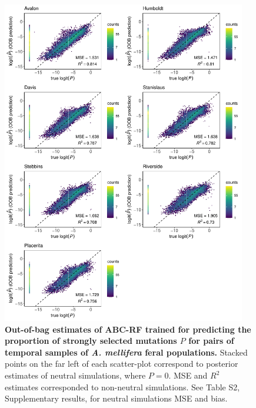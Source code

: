 \documentclass[a4paper, 12pt]{article}
\begin{document}
\begin{figure}[ht]
  \centering
  \includegraphics[width=0.95\textwidth]{Figures/FigureS19_combined_plot_pstrong.pdf}
  \small\caption{\textbf{Out-of-bag estimates of ABC-RF trained for predicting the proportion of strongly selected mutations $P$ for pairs of temporal samples of \textit{A. mellifera} feral populations.} Stacked points on the far left of each scatter-plot correspond to posterior estimates of neutral simulations, where $P = 0$. MSE and $R^2$ estimates corresponded to non-neutral simulations. See Table S2, Supplementary results, for neutral simulations MSE and bias.}
  \label{fig:supple_feralbee_pstrong}
\end{figure}
\end{document}
